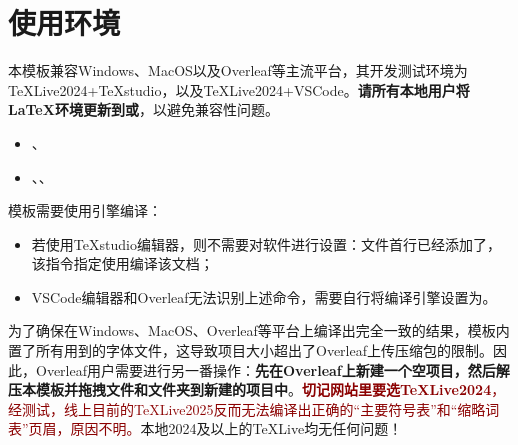 \documentclass[doctor, vlined, ]{DissertUESTC}
\begin{document}
	\section{使用环境}

	本模板兼容Windows、MacOS以及Overleaf等主流平台，其开发测试环境为TeXLive2024+TeXstudio，以及TeXLive2024+VSCode。\textbf{请所有本地用户将LaTeX环境更新到\href{https://mirrors.tuna.tsinghua.edu.cn/tex-historic-archive/systems/texlive/}{\color{DarkRed}}或\href{https://mirrors.tuna.tsinghua.edu.cn/tex-historic-archive/systems/mactex/}{\color{DarkRed}}}，以避免兼容性问题。

	\begin{itemize}
		\item \href{https://zhuanlan.zhihu.com/p/389394015}{\color{DarkRed}}、\href{https://blog.csdn.net/ChrisP_333/article/details/82943508}{\color{DarkRed}}
		\item \href{https://texstudio.sourceforge.net/#download}{\color{DarkRed}}、\href{https://code.visualstudio.com/Download}{\color{DarkRed}}、\href{https://zhuanlan.zhihu.com/p/166523064}{\color{DarkRed}}
	\end{itemize}
	
	模板需要使用引擎编译：
	\begin{itemize}
		\item 若使用TeXstudio编辑器，则不需要对软件进行设置：文件首行已经添加了，该指令指定使用编译该文档；
		
		\item VSCode编辑器和Overleaf无法识别上述命令，需要自行将编译引擎设置为。
	\end{itemize}
	

	为了确保在Windows、MacOS、Overleaf等平台上编译出完全一致的结果，模板内置了所有用到的字体文件，这导致项目大小超出了Overleaf上传压缩包的限制。因此，Overleaf用户需要进行另一番操作：\textbf{先在Overleaf上新建一个空项目，然后解压本模板并拖拽文件和文件夹到新建的项目中}。\textcolor{DarkRed}{\textbf{切记网站里要选TeXLive2024}，经测试，线上目前的TeXLive2025反而无法编译出正确的“主要符号表”和“缩略词表”页眉，原因不明。}本地2024及以上的TeXLive均无任何问题！
\end{document}
